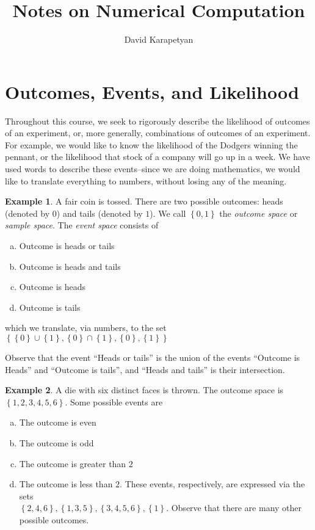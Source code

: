 \documentclass[12pt]{article}
\theoremstyle{plain}
\theoremstyle{definition}
\newtheorem*{example}{Example}
\theoremstyle{remark}
\numberwithin{equation}{section}  %
\begin{document}
\title{Notes on Numerical Computation }
\author{David Karapetyan}
\date{}
\maketitle
\newpage
\setcounter{tocdepth}{2}
\tableofcontents

\newpage
		\section{Outcomes, Events, and Likelihood}
		
		Throughout this course, we seek to rigorously describe the likelihood of
		outcomes of an experiment, or, more generally, combinations of outcomes of an experiment.
		For example, we would like to know the likelihood of the Dodgers
		winning the pennant, or the likelihood that stock of a company will go up
		in a week. We have used words to describe these events--since we are doing
		mathematics, we would like to translate everything to numbers, without losing
		any of the meaning.
	\begin{example}
A fair coin is tossed. There are two possible outcomes: heads (denoted by $0$) 
and tails (denoted by $1$). We call $ \left\{ 0,1 \right\} $ the \emph{outcome
space} or \emph{sample space}. The \emph{event space} consists of
\begin{enumerate}[a)]
\item Outcome is heads or tails
\item Outcome is heads and tails
\item Outcome is heads
\item Outcome is tails
\end{enumerate}
which we translate, via numbers, to the set $ \left\{ \left\{ 0 \right\} \cup
\left\{ 1 \right\}, \left\{ 0 \right\} \cap \left\{ 1 \right\} , \left\{ 0
\right\} , \left\{ 1 \right\} \right \} $
\end{example}	
Observe that the event ``Heads or tails'' is the union of the events
``Outcome is Heads'' and ``Outcome is tails'', and ``Heads and tails'' is
their intersection.
\begin{example}
A die with six distinct faces is thrown. The outcome space is
$ \left\{ 1, 2, 3, 4, 5, 6 \right\} $. Some possible events are
\begin{enumerate}[a)]
\item The outcome is even
\item The outcome is odd
\item The outcome is greater than $2$
\item The outcome is less than $2$.
These events, respectively, are expressed via the sets \\
$ \left\{ 2, 4, 6 \right\} , \left\{ 1,3,5 \right\} , \left\{ 3, 4, 5, 6
\right\}, \left\{ 1 \right\} $.
Observe that there are many other possible outcomes.
\end{enumerate}
\end{example}	
\end{document}
